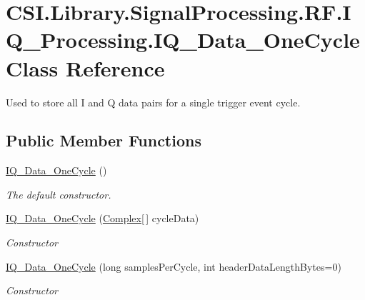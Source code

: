 \hypertarget{class_c_s_i_1_1_library_1_1_signal_processing_1_1_r_f_1_1_i_q___processing_1_1_i_q___data___one_cycle}{}\section{C\+S\+I.\+Library.\+Signal\+Processing.\+R\+F.\+I\+Q\+\_\+\+Processing.\+I\+Q\+\_\+\+Data\+\_\+\+One\+Cycle Class Reference}
\label{class_c_s_i_1_1_library_1_1_signal_processing_1_1_r_f_1_1_i_q___processing_1_1_i_q___data___one_cycle}


Used to store all I and Q data pairs for a single trigger event cycle.  


\subsection*{Public Member Functions}
\begin{DoxyCompactItemize}
\item 
\mbox{\hyperlink{class_c_s_i_1_1_library_1_1_signal_processing_1_1_r_f_1_1_i_q___processing_1_1_i_q___data___one_cycle_af4f4c65ff587b969ab6a67c9ac7ccb9b}{I\+Q\+\_\+\+Data\+\_\+\+One\+Cycle}} ()
\begin{DoxyCompactList}\small\item\em The default constructor. \end{DoxyCompactList}\item 
\mbox{\hyperlink{class_c_s_i_1_1_library_1_1_signal_processing_1_1_r_f_1_1_i_q___processing_1_1_i_q___data___one_cycle_ade01f7a3546b29f6d69205eeba203a96}{I\+Q\+\_\+\+Data\+\_\+\+One\+Cycle}} (\mbox{\hyperlink{struct_c_s_i_1_1_library_1_1_data_types_1_1_complex}{Complex}}\mbox{[}$\,$\mbox{]} cycle\+Data)
\begin{DoxyCompactList}\small\item\em Constructor \end{DoxyCompactList}\item 
\mbox{\hyperlink{class_c_s_i_1_1_library_1_1_signal_processing_1_1_r_f_1_1_i_q___processing_1_1_i_q___data___one_cycle_a8df6e4de443f161db848ade2ad9e1503}{I\+Q\+\_\+\+Data\+\_\+\+One\+Cycle}} (long samples\+Per\+Cycle, int header\+Data\+Length\+Bytes=0)
\begin{DoxyCompactList}\small\item\em Constructor \end{DoxyCompactList}\end{DoxyCompactItemize}

